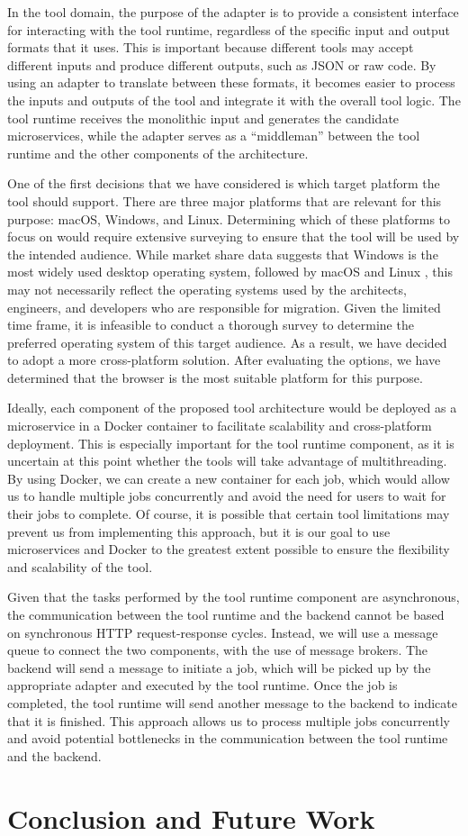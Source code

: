 \documentclass[conference]{IEEEtran}
\begin{document}
In the tool domain, the purpose of the adapter is to provide a consistent
interface for interacting with the tool runtime, regardless of the specific
input and output formats that it uses. This is important because different
tools may accept different inputs and produce different outputs, such as JSON
or raw code. By using an adapter to translate between these formats, it becomes
easier to process the inputs and outputs of the tool and integrate it with the
overall tool logic. The tool runtime receives the monolithic input and
generates the candidate microservices, while the adapter serves as a
``middleman'' between the tool runtime and the other components of the
architecture.

One of the first decisions that we have considered is which target platform the
tool should support. There are three major platforms that are relevant for this
purpose: macOS, Windows, and Linux. Determining which of these platforms to
focus on would require extensive surveying to ensure that the tool will be used
by the intended audience. While market share data suggests that Windows is the
most widely used desktop operating system, followed by macOS and Linux
\cite{desktop-usage-worldwide}, this may not necessarily reflect the operating
systems used by the architects, engineers, and developers who are responsible
for migration. Given the limited time frame, it is infeasible to conduct a
thorough survey to determine the preferred operating system of this target
audience. As a result, we have decided to adopt a more cross-platform solution.
After evaluating the options, we have determined that the browser is the most
suitable platform for this purpose.

Ideally, each component of the proposed tool architecture would be deployed as
a microservice in a Docker container to facilitate scalability and
cross-platform deployment. This is especially important for the tool runtime
component, as it is uncertain at this point whether the tools will take
advantage of multithreading. By using Docker, we can create a new container for
each job, which would allow us to handle multiple jobs concurrently and avoid
the need for users to wait for their jobs to complete. Of course, it is
possible that certain tool limitations may prevent us from implementing this
approach, but it is our goal to use microservices and Docker to the greatest
extent possible to ensure the flexibility and scalability of the tool.

Given that the tasks performed by the tool runtime component are asynchronous,
the communication between the tool runtime and the backend cannot be based on
synchronous HTTP request-response cycles. Instead, we will use a message queue
to connect the two components, with the use of message brokers. The backend
will send a message to initiate a job, which will be picked up by the
appropriate adapter and executed by the tool runtime. Once the job is
completed, the tool runtime will send another message to the backend to
indicate that it is finished. This approach allows us to process multiple jobs
concurrently and avoid potential bottlenecks in the communication between the
tool runtime and the backend.

\section{Conclusion and Future Work}




\end{document}
